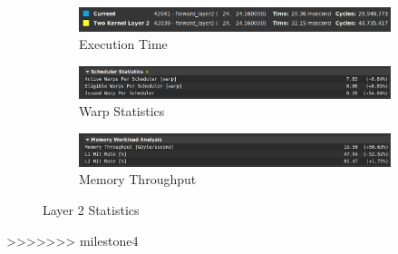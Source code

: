 \documentclass{article}
\begin{document}
\begin{figure}[H]
    \centering
    \begin{subfigure}[b]{\linewidth}
        \includegraphics[width=\linewidth]{ms4_layer2_runtime}
        \caption{Execution Time}
    \end{subfigure}
    \begin{subfigure}[b]{\linewidth}
        \includegraphics[width=\linewidth]{ms4_layer2_warp}
        \caption{Warp Statistics}
    \end{subfigure}
    \begin{subfigure}[b]{\linewidth}
        \includegraphics[width=\linewidth]{ms4_layer2_mem}
        \caption{Memory Throughput}
    \end{subfigure}
    \caption{Layer 2 Statistics}
\end{figure}
>>>>>>> milestone4
\end{document}
